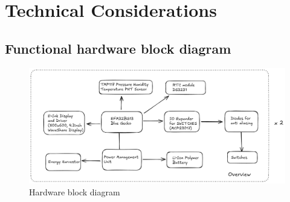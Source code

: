 \documentclass[a4paper,11pt]{article}%
\begin{document}
\section{Technical Considerations}


\subsection{Functional hardware block diagram}



\begin{figure}[H]
    \centering
    \includegraphics[scale=0.4]{figures/hw.png}
    \caption{Hardware block diagram}
\end{figure}
\vspace{0.2cm}
\end{document}
